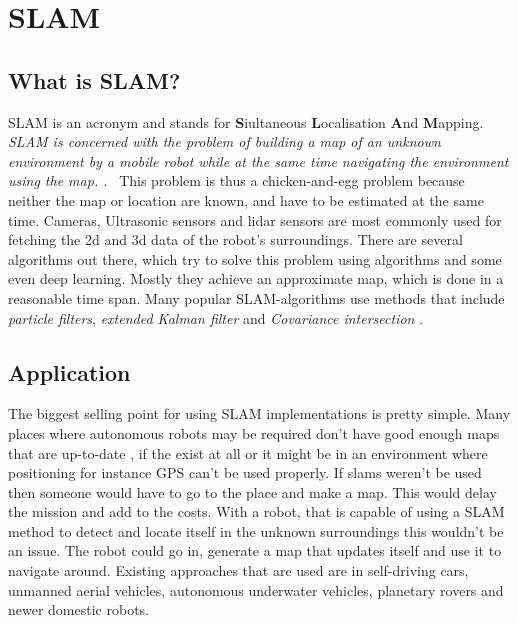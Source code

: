 
\chapter{SLAM\authorA}

\section{What is SLAM?}
SLAM is an acronym and stands for \textbf{S}iultaneous \textbf{L}ocalisation \textbf{A}nd \textbf{M}apping.
\emph{\glqq SLAM is concerned with the problem of building a map of an unknown environment by a mobile robot while at the same time navigating the environment using the map. .\grqq}~\cite{slamfordummies} \newline
This problem is thus a chicken-and-egg problem because neither the map or location are known, and have to be estimated at the same time. Cameras, Ultrasonic sensors and lidar sensors are most commonly used for fetching the 2d and 3d data of the robot's surroundings.\cite{arreverie} \newline
There are several algorithms out there, which try to solve this problem using algorithms and some even deep learning. Mostly they achieve an approximate map, which is done in a reasonable time span. Many popular SLAM-algorithms use methods that include \textit{particle filters}, \textit{extended Kalman filter} and \textit{Covariance intersection}\cite{slamfordummies} \cite{1678144}. \newline

\section{Application}
The biggest selling point for using SLAM implementations is pretty simple. Many places where autonomous robots may be required don't have good enough maps that are up-to-date , if the exist at all or it might be in an environment where positioning for instance GPS can't be used properly.\cite{techapeekslam} If slams weren't be used then someone would have to go to the place and make a map. This would delay the mission and add to the costs. \newline
With a robot, that is capable of using a SLAM method to detect and locate itself in the unknown surroundings this wouldn't be an issue. The robot could go in, generate a map that updates itself and use it to navigate around. \newline
Existing approaches that are used are in self-driving cars, unmanned aerial vehicles, autonomous underwater vehicles, planetary rovers and newer domestic robots.

